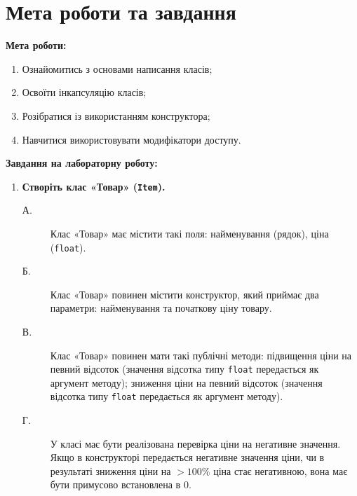 \section{Мета роботи та завдання}

\textbf{Мета роботи:}
\begin{enumerate}
    \item Ознайомитись з основами написання класів;
    \item Освоїти інкапсуляцію класів;
    \item Розібратися із використанням конструктора;
    \item Навчитися використовувати модифікатори доступу.
\end{enumerate}

\skipline
\textbf{Завдання на лабораторну роботу:}
\begin{enumerate}
    \item \textbf{Створіть клас «Товар» (\texttt{Item}).}
    \begin{description}
        \item[А.] 
        Клас «Товар» має містити такі поля: найменування (рядок), ціна (\texttt{float}).
        \item[Б.] 
        Клас «Товар» повинен містити конструктор, який приймає два параметри: найменування 
        та початкову ціну товару.
        \item[В.] 
        Клас «Товар» повинен мати такі публічні методи: підвищення ціни на певний відсоток 
        (значення відсотка типу \texttt{float} передається як аргумент методу); зниження ціни 
        на певний відсоток (значення відсотка типу \texttt{float} передається як аргумент методу).
        \item[Г.] У класі має бути реалізована перевірка ціни на негативне значення. 
        Якщо в конструкторі передається негативне значення ціни, чи в результаті зниження 
        ціни на $>100\%$ ціна стає негативною, вона має бути примусово встановлена в 0.
    \end{description}


\end{enumerate}
